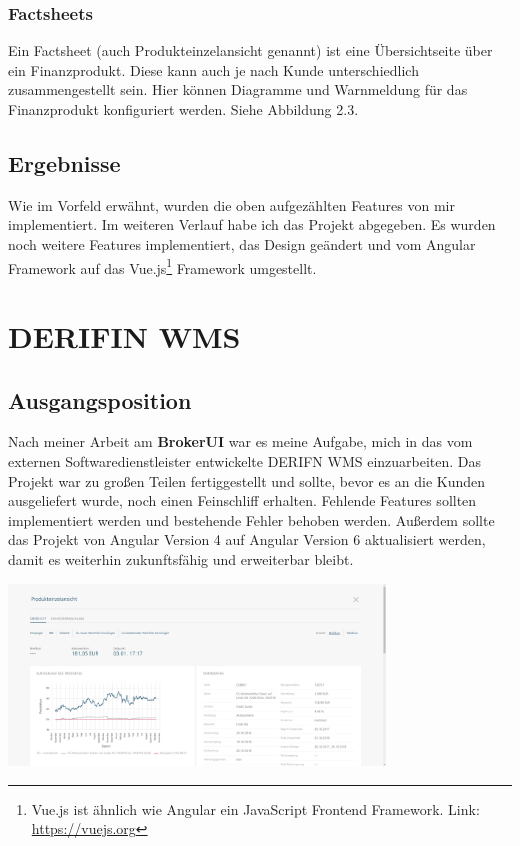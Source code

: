 \documentclass[chapterprefix=false, 12pt, a4paper, oneside, parskip=half, listof=totoc, bibliography=totoc, numbers=noendperiod]{scrbook}
\begin{document}
    \subsubsection{Factsheets}

    Ein Factsheet (auch Produkteinzelansicht genannt) ist eine Übersichtseite über ein Finanzprodukt. Diese kann auch je nach Kunde unterschiedlich zusammengestellt sein.
    Hier können Diagramme und Warnmeldung für das Finanzprodukt konfiguriert werden. Siehe Abbildung 2.3.

    \subsection{Ergebnisse}

    Wie im Vorfeld erwähnt, wurden die oben aufgezählten Features von mir implementiert. Im weiteren Verlauf habe ich das Projekt
    abgegeben. Es wurden noch weitere Features implementiert, das Design geändert und vom Angular Framework
    auf das Vue.js\footnote{Vue.js ist ähnlich wie Angular ein JavaScript Frontend Framework. Link: \url{https://vuejs.org}}
    Framework umgestellt.

    \section{DERIFIN WMS}

    \subsection{Ausgangsposition}

    Nach meiner Arbeit am \textbf{BrokerUI} war es meine Aufgabe, mich in das vom externen Softwaredienstleister
    entwickelte DERIFN WMS einzuarbeiten. Das Projekt war zu großen Teilen fertiggestellt und sollte, bevor es an die
    Kunden ausgeliefert wurde, noch einen Feinschliff erhalten. Fehlende Features sollten implementiert werden und bestehende
    Fehler behoben werden. Außerdem sollte das Projekt von Angular Version 4 auf Angular Version 6 aktualisiert werden, damit
    es weiterhin zukunftsfähig und erweiterbar bleibt.

    \begin{center}
        \includegraphics[width=0.75\textwidth]{img/derifin.png}
    \end{center}
\end{document}
